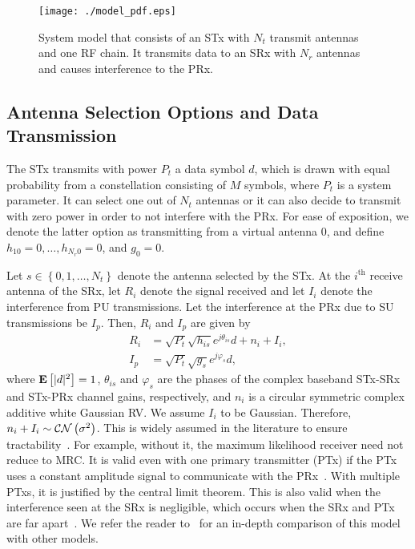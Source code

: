 \documentclass[journal]{IEEEtran}
\newcommand{\CN}{{\cal CN}}
\newcommand{\expect}[1]{{\bf{E}}\left[{#1}\right]}
\newcommand{\nx}{{0}}
\newcommand{\Nt}{{N_t}}
\newcommand{\Nr}{{N_r}}
\newcommand{\Pt}{{P_t}}
\newcommand{\such}{h}
\newcommand{\puch}{g}
\newcommand{\hk}[1]{{\such_{#1}}}
\newcommand{\gk}[1]{{\puch_{#1}}}
\newcommand{\Rsrx}{R_{i}}
\newcommand{\Iprx}{I_{p}}
\newcommand{\Isrx}{I_{i}}
\newcommand{\noise}{n_i}
\newcommand{\noisevar}{\sigma^2}
\newcommand{\allopts}{\left\{\nx,1,\ldots,\Nt\right\}}
\newcommand{\suchph}{\theta}
\newcommand{\puchph}{\varphi}
\newcommand{\thetahk}{\suchph_{is}}
\newcommand{\thetagk}{\puchph_{s}}
\newcommand{\ith}{i^{\text{th}}}
\newcommand{\datasymbol}{d}
\begin{document}
\begin{figure}
\centering 
\texttt{[image: ./model\_pdf.eps]}
\caption{System model that consists of an STx with $\Nt$ transmit antennas and one RF chain. It transmits data to an SRx with $\Nr$ antennas and causes interference to the PRx.}
\label{fig:MODEL}
\end{figure}



\subsection{Antenna Selection Options and Data Transmission}\label{sec:antenna_selection_options}
The STx transmits with power $\Pt$ a data symbol $\datasymbol$, which is drawn with equal probability from a constellation consisting of $M$ symbols, where $\Pt$ is a system parameter. It can select one out of $\Nt$ antennas or it can also decide to transmit with zero power in order to not interfere with the PRx. For ease of exposition, we denote the latter option as transmitting from a virtual antenna $\nx$, and define $\hk{1\nx} = 0,\ldots,\hk{\Nr\nx} = 0$, and $\gk{\nx}= 0$. 

Let $s\in\allopts$ denote the antenna selected by the STx. At the $\ith$ receive antenna of the SRx, let $\Rsrx$ denote the signal received and let $\Isrx$ denote the interference from PU transmissions. Let the interference at the PRx due to SU transmissions be $\Iprx$. Then, $\Rsrx$ and $\Iprx$ are given by
%
\begin{align}
\label{eq:r_su}
 \Rsrx &= \sqrt{\Pt}\sqrt{\hk{is}} e^{j\thetahk} \datasymbol + \noise + \Isrx, \\
 \label{eq:i}
 \Iprx &= \sqrt{\Pt}\sqrt{\gk{s}} e^{j\thetagk} \datasymbol,
\end{align}
%
where $\expect{|\datasymbol|^2}=1$, $\thetahk$ and $\thetagk$ are the phases of the complex baseband STx-SRx and STx-PRx channel gains, respectively, and $\noise$ is a circular symmetric complex additive white Gaussian RV. We assume $\Isrx$ to be Gaussian. Therefore, $\noise + \Isrx\sim \CN\left(\noisevar\right)$. This is widely assumed in the literature to ensure tractability~\cite{Sarvendranath_2013_TCOM,Wang_2011_TCom, Kashyap_2014_TCOM,Sarvendranath_2014_TCOM}. For example, without it, the maximum likelihood receiver need not reduce to MRC. It is valid even with one primary transmitter (PTx) if the PTx uses a constant amplitude signal to communicate with the PRx~\cite{Kashyap_2014_TCOM}. With multiple PTxs, it is justified by the central limit theorem. This is also valid when the interference seen at the SRx is negligible, which  occurs when the SRx and PTx are far apart~\cite{musavian_2009_tcom,RZhang_2009_TWC,li_2011_pimrc}. We refer the reader to~\cite{das_2015_twc} for an in-depth comparison of this model with other models. 
\end{document}
